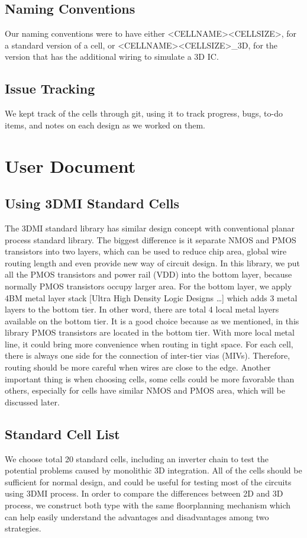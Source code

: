 \documentclass{article}
\begin{document}
\subsection{Naming Conventions} Our naming conventions were to have either \textless CELLNAME\textgreater \textless CELLSIZE\textgreater, for a standard version of a cell, or \textless CELLNAME\textgreater \textless CELLSIZE\textgreater\_3D, for the version that has the additional wiring to simulate a 3D IC. 
\subsection{Issue Tracking} We kept track of the cells through git, using it to track progress, bugs, to-do items, and notes on each design as we worked on them. 


\section{User Document}
\subsection{Using 3DMI Standard Cells}
The 3DMI standard library has similar design concept with conventional planar process standard library. The biggest difference is it separate NMOS and PMOS transistors into two layers, which can be used to reduce chip area, global wire routing length and even provide new way of circuit design.
  In this library, we put all the PMOS transistors and power rail (VDD) into the bottom layer, because normally PMOS transistors occupy larger area. For the bottom layer, we apply 4BM metal layer stack [Ultra High Density Logic Designs …] which adds 3 metal layers to the bottom tier. In other word, there are total 4 local metal layers available on the bottom tier. It is a good choice because as we mentioned, in this library PMOS transistors are located in the bottom tier. With more local metal line, it could bring more convenience when routing in tight space.
  For each cell, there is  always one side for the connection of  inter-tier vias (MIVs). Therefore, routing should be more careful when wires are close to the edge. Another important thing is when choosing cells, some cells could be more  favorable than others, especially for cells have similar NMOS and PMOS area, which will be discussed later.

\subsection{Standard Cell List}
  We choose total 20 standard cells, including an inverter chain to test the potential problems caused by monolithic 3D integration. All of the cells should be sufficient for normal design, and could be useful for testing most of the circuits using 3DMI process. In order to compare the differences between 2D and 3D process, we construct both type with the same floorplanning mechanism which can help easily understand the advantages and disadvantages among two strategies.
\end{document}
